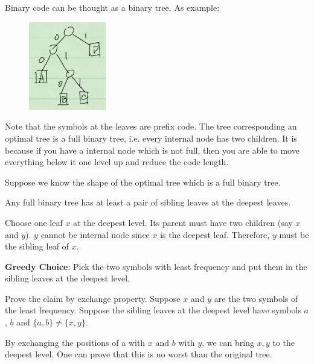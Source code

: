 Binary code can be thought as a binary tree. As example:
\begin{figure}[H]
	\centering
	\includegraphics[width=0.3\textwidth]{binary-code-tree.png}
\end{figure}

Note that the symbols at the leaves are prefix code. The tree corresponding an optimal tree is a full binary tree, i.e. every internal node has two children. It is because if you have a internal node which is not full, then you are able to move everything below it one level up and reduce the code length.

Suppose we know the shape of the optimal tree which is a full binary tree.

\begin{claim}
	Any full binary tree has at least a pair of sibling leaves at the deepest leaves.
\end{claim}

\begin{claimproof}
	Choose one leaf $x$ at the deepest level. Its parent must have two children (say $x$ and $y$). $y$ cannot be internal node since $x$ is the deepest leaf. Therefore, $y$ must be the sibling leaf of $x$.
\end{claimproof}

\begin{claim}
	\textbf{Greedy Choice}: Pick the two symbols with least frequency and put them in the sibling leaves at the deepest level.
\end{claim}

\begin{claimproof}
	Prove the claim by exchange property. Suppose $x$ and $y$ are the two symbols of the least frequency. Suppose the sibling leaves at the deepest level have symbols $a$, $b$ and $\{a, b\} \neq \{x, y\}$.
	
	By exchanging the positions of a with $ x $ and $ b $ with $ y $, we can bring $ x, y $ to the deepest level. One can prove that this is no worst than the original tree.
	
\end{claimproof}

